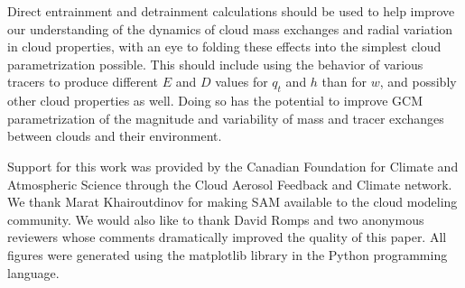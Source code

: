 \documentclass[12pt]{article}
\begin{document}
Direct entrainment and detrainment calculations should be used to help 
improve our understanding of the dynamics of cloud mass exchanges and 
radial variation in cloud properties, with an eye to folding these effects
into the simplest cloud parametrization possible.  This should include 
using the behavior of various tracers to produce different $E$ and $D$ 
values for $q_t$ and $h$ than for $w$, and possibly other cloud properties 
as well.  Doing so has the potential to improve GCM parametrization of the 
magnitude and variability of mass and tracer exchanges between clouds and
their environment.

\begin{acknowledgment} 
Support for this work was provided by the Canadian Foundation for Climate and 
Atmospheric Science through the Cloud Aerosol Feedback and Climate network.
We thank Marat Khairoutdinov for making SAM available to the cloud modeling 
community.  We would also like to thank David Romps and two anonymous 
reviewers whose comments dramatically improved the quality of this paper.  
All figures were generated using the matplotlib library in the Python 
programming language.
\end{acknowledgment}
\end{document}
